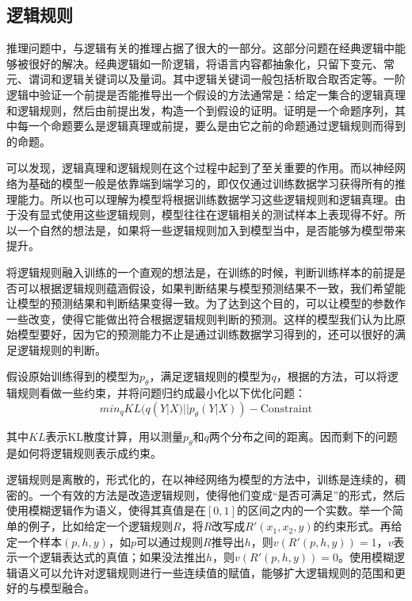 \documentclass[UTF8,11pt,a4paper,nofonts]{ctexart}
\begin{document}
\subsection{逻辑规则}


推理问题中，与逻辑有关的推理占据了很大的一部分。这部分问题在经典逻辑中能够被很好的解决。经典逻辑如一阶逻辑，将语言内容都抽象化，只留下变元、常元、谓词和逻辑关键词以及量词。其中逻辑关键词一般包括析取合取否定等。一阶逻辑中验证一个前提是否能推导出一个假设的方法通常是：给定一集合的逻辑真理和逻辑规则，然后由前提出发，构造一个到假设的证明。证明是一个命题序列，其中每一个命题要么是逻辑真理或前提，要么是由它之前的命题通过逻辑规则而得到的命题。

可以发现，逻辑真理和逻辑规则在这个过程中起到了至关重要的作用。而以神经网络为基础的模型一般是依靠端到端学习的，即仅仅通过训练数据学习获得所有的推理能力。所以也可以理解为模型将根据训练数据学习这些逻辑规则和逻辑真理。由于没有显式使用这些逻辑规则，模型往往在逻辑相关的测试样本上表现得不好。所以一个自然的想法是，如果将一些逻辑规则加入到模型当中，是否能够为模型带来提升。



将逻辑规则融入训练的一个直观的想法是，在训练的时候，判断训练样本的前提是否可以根据逻辑规则蕴涵假设，如果判断结果与模型预测结果不一致，我们希望能让模型的预测结果和判断结果变得一致。为了达到这个目的，可以让模型的参数作一些改变，使得它能做出符合根据逻辑规则判断的预测。这样的模型我们认为比原始模型要好，因为它的预测能力不止是通过训练数据学习得到的，还可以很好的满足逻辑规则的判断。

假设原始训练得到的模型为$p_\theta$，满足逻辑规则的模型为$q$，根据\cite{Hu2016HarnessingDN}的方法，可以将逻辑规则看做一些约束，并将问题归约成最小化以下优化问题：
\begin{equation}
min_{q} KL(q(Y|X) || p_\theta(Y|X)) - \text{Constraint}
\end{equation}

其中$KL$表示KL散度计算，用以测量$p_\theta$和$q$两个分布之间的距离。因而剩下的问题是如何将逻辑规则表示成约束。

逻辑规则是离散的，形式化的，在以神经网络为模型的方法中，训练是连续的，稠密的。一个有效的方法是改造逻辑规则，使得他们变成“是否可满足”的形式，然后使用模糊逻辑作为语义，使得其真值是在$[0,1]$的区间之内的一个实数。举一个简单的例子，比如给定一个逻辑规则$R$，将$R$改写成$R'(x_1,x_2,y)$的约束形式。再给定一个样本$(p,h,y)$，如$p$可以通过规则$R$推导出$h$，则$v(R'(p,h,y))=1$，$v$表示一个逻辑表达式的真值；如果没法推出$h$，则$v(R'(p,h,y))=0$。使用模糊逻辑语义可以允许对逻辑规则进行一些连续值的赋值，能够扩大逻辑规则的范围和更好的与模型融合。
\end{document}
